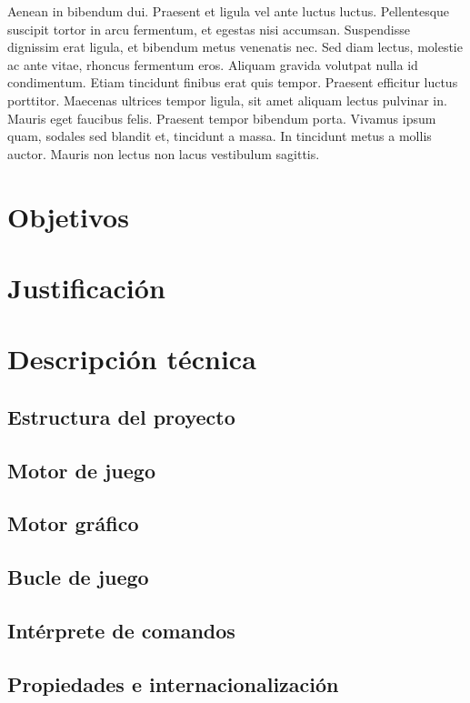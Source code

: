 \documentclass[a4paper,
	11pt,
	parskip=full,
	bibliography=totoc,
	twoside
	]{scrartcl}
\let\oldsection\section
\def\section{\cleardoubleoddpage\oldsection}
\begin{document}
	Aenean in bibendum dui. Praesent et ligula vel ante luctus luctus. Pellentesque suscipit tortor in arcu fermentum, et egestas nisi accumsan. Suspendisse dignissim erat ligula, et bibendum metus venenatis nec. Sed diam lectus, molestie ac ante vitae, rhoncus fermentum eros. Aliquam gravida volutpat nulla id condimentum. Etiam tincidunt finibus erat quis tempor. Praesent efficitur luctus porttitor. Maecenas ultrices tempor ligula, sit amet aliquam lectus pulvinar in. Mauris eget faucibus felis. Praesent tempor bibendum porta. Vivamus ipsum quam, sodales sed blandit et, tincidunt a massa. In tincidunt metus a mollis auctor. Mauris non lectus non lacus vestibulum sagittis. 

\section{Objetivos}

\section{Justificación}

\section{Descripción técnica}
	\subsection{Estructura del proyecto}
	
	\subsection{Motor de juego}
	
	\subsection{Motor gráfico}
	
	\subsection{Bucle de juego}
	
	\subsection{Intérprete de comandos}
	
	\subsection{Propiedades e internacionalización}
	
\end{document}

